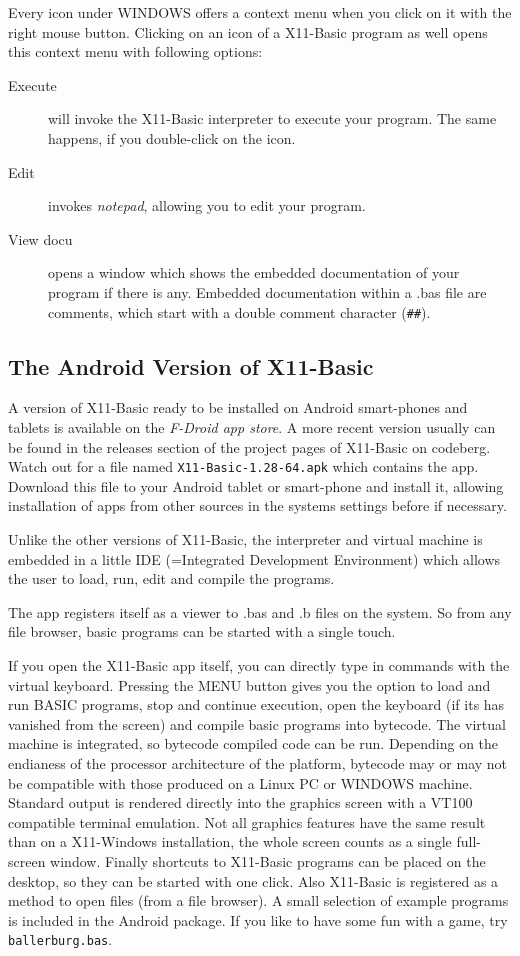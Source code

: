 Every icon under WINDOWS offers a context menu when you click on it with the
right mouse button. Clicking on an icon of a X11-Basic program as well opens this 
context menu with following options: 
\begin{description}
\item[Execute] will invoke the X11-Basic interpreter to execute your program. 
The same happens, if you double-click on the icon.
\item[Edit] invokes {\it notepad}, allowing you to edit your program.
\item[View docu] opens a window which shows the embedded documentation 
of your program if there is any. Embedded documentation within a .bas file are comments, which
start with a double comment character (\verb|##|).
\end{description}

\subsection{The Android Version of X11-Basic}

A version of X11-Basic ready to be installed on Android smart-phones and tablets
is available on the {\it F-Droid app store}. 
A more recent version usually can be found in the releases section of the project 
pages of X11-Basic on codeberg. Watch out for a file named 
\verb|X11-Basic-1.28-64.apk| which contains the app.  Download this file to 
your Android tablet or smart-phone and install it, allowing installation 
of apps from other sources in the systems settings before if necessary.

Unlike the other versions of X11-Basic, the interpreter and virtual machine is
embedded in a little IDE (=Integrated Development Environment) which allows the
user to load, run, edit and compile the programs.

The app registers itself as a viewer to .bas and .b files on the system. So
from any file browser, basic programs can be started with a single touch. 

If you open the X11-Basic app itself, you can directly type in commands with
the virtual keyboard. Pressing the MENU button gives you the option to load and
run BASIC programs, stop and continue execution, open the keyboard (if its has
vanished from the screen) and compile basic programs into bytecode. The virtual
machine is integrated, so bytecode compiled code can be run. Depending on the
endianess of the processor architecture of the platform, bytecode may or may not
be compatible with those produced on a Linux PC or WINDOWS machine. Standard
output is rendered directly into the graphics screen with a VT100 compatible
terminal emulation. Not all graphics features have the same result than on a
X11-Windows installation, the whole screen counts as a single full-screen
window. Finally shortcuts to X11-Basic programs can be placed on the desktop,
so they can be started with one click. Also X11-Basic is registered as a method
to open files (from a file browser).  A small selection of example programs is
included in the Android package. If you like to have some fun with a game, try
\verb|ballerburg.bas|.

